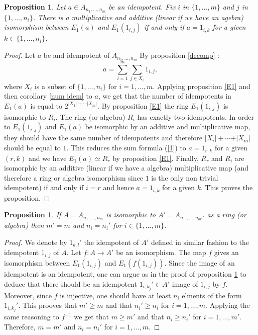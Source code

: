 \documentclass[12pt, reqno]{amsart}
\newtheorem{proposition}[theorem]{Proposition}
\begin{document}
\begin{proposition}\label{idem}
Let $a\in  A_{n_1,\dots,n_m}$ be an idempotent. Fix $i$ in $\{1,\dots,m\}$ and $j$ in $\{1,\dots,n_i\}$. There is a multiplicative and additive (linear if we have an agebra)  isomorphism between $E_1(a)$ and $E_1(1_{i,j})$ if and only if $a=1_{i,k}$ for a given $k\in\{1,\dots,n_i\}$. 
\end{proposition}
\begin{proof}
Let $a$ be and idempotent of $ A_{n_1,\dots,n_m}$ By proposition \ref{decomp} : 
\begin{equation}\label{1}
a=\overset{m}{\underset{i=1}{\sum}} \underset{j\in X_i}{\sum} 1_{i,j}, 
\end{equation}
where $X_i$ is a subset of $\{1,\dots,n_i\}$ for $i=1,\dots,m$. 
Applying proposition \ref{E1} and then corollary \ref{num idem} to $a$, we get that the number of idempotents in $E_1(a)$ is equal to $2^{\vert X_1\vert +\cdots \vert X_m \vert }$. By proposition \ref{E1} the ring $E_1(1_{i,j})$ is isomorphic to $R_i$. The ring (or algebra) $R_i$  has exactly two idempotents. In order to $E_1(1_{i,j})$ and $E_1(a)$ be isomorphic by an additive and multiplicative map, they should have the same number of idempotents and therefore $\vert X_i\vert +\cdots +\vert X_m \vert $ should be equal to $1$. This reduces the sum formula (\ref{1}) to $a=1_{r,k}$ for a given $(r,k)$ and we have $E_1(a)\simeq R_r$ by proposition \ref{E1}. Finally, $R_r$ and $R_i$ are isomorphic by an additive (linear if we have a algebra) multiplicative map (and therefore a ring or algebra isomorphism since $1$ is the only non trivial idempotent) if and only if $i=r$ and hence $a=1_{i,k}$ for a given $k$. This proves the proposition.
\end{proof}
\begin{proposition}\label{iso}
If $A=A_{n_1,\dots,n_m}$ is isomorphic to $A'=A_{n_1',\dots,n_{m'}'}$ as a ring (or algebra) then $m'=m$ and $n_i=n_i'$ for $i\in \{1,\dots,m\}$.
\end{proposition}
\begin{proof}
We denote by $1_{k,l}'$ the idempotent of $A'$ defined in similar fashion to the idempotent $1_{i,j}$ of $A$. Let $f:A\to A'$ be an isomorphism. The map $f$ gives an isomorphism between $E_1(1_{i,j})$ and $E_1(f(1_{i,j}))$. Since the image of an idempotent is an idempotent, one can argue as in the proof of proposition \ref{idem} to deduce that there should be an idempotent $1_{i,k_j}'\in A'$ image of $1_{i,j}$ by $f$. Moreover, since $f$ is injective, one should have at least $n_i$ elments of the form $1_{i,k_j}'$. This prooves that $m'\geq m$ and that $n_{i}'\geq n_i$ for $i=1,\dots,m$. Applying the same reasoning to $f^{-1}$ we get that $m\geq m'$ and that $n_{i}\geq n_i'$ for $i=1,\dots,m'$. Therefore, $m=m'$ and $n_i=n_i'$ for $i=1,\dots,m$.
\end{proof}
\end{document}
